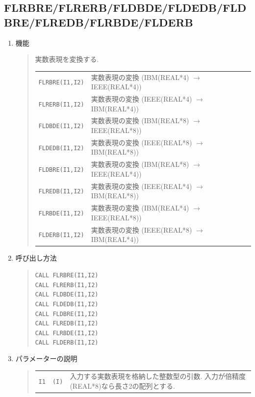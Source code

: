 \subsection{FLRBRE/FLRERB/FLDBDE/FLDEDB/FLDBRE/FLREDB/FLRBDE/FLDERB}
\begin{enumerate}
  \item 機能
  \begin{quote}
    実数表現を変換する.\\
    \begin{tabular}{lp{10cm}}
     {\tt FLRBRE(I1,I2)}  & 実数表現の変換 (IBM(REAL*4) $\to$ IEEE(REAL*4)) \\
     {\tt FLRERB(I1,I2)}  & 実数表現の変換 (IEEE(REAL*4) $\to$ IBM(REAL*4)) \\
     {\tt FLDBDE(I1,I2)}  & 実数表現の変換 (IBM(REAL*8) $\to$ IEEE(REAL*8)) \\
     {\tt FLDEDB(I1,I2)}  & 実数表現の変換 (IEEE(REAL*8) $\to$ IBM(REAL*8)) \\
     {\tt FLDBRE(I1,I2)}  & 実数表現の変換 (IBM(REAL*8) $\to$ IEEE(REAL*4)) \\
     {\tt FLREDB(I1,I2)}  & 実数表現の変換 (IEEE(REAL*4) $\to$ IBM(REAL*8)) \\
     {\tt FLRBDE(I1,I2)}  & 実数表現の変換 (IBM(REAL*4) $\to$ IEEE(REAL*8)) \\
     {\tt FLDERB(I1,I2)}  & 実数表現の変換 (IEEE(REAL*8) $\to$ IBM(REAL*4))
    \end{tabular}
  \end{quote}
  \item 呼び出し方法
  \begin{quote}
     {\tt CALL FLRBRE(I1,I2)} \\
     {\tt CALL FLRERB(I1,I2)} \\
     {\tt CALL FLDBDE(I1,I2)} \\
     {\tt CALL FLDEDB(I1,I2)} \\
     {\tt CALL FLDBRE(I1,I2)} \\
     {\tt CALL FLREDB(I1,I2)} \\
     {\tt CALL FLRBDE(I1,I2)} \\
     {\tt CALL FLDERB(I1,I2)}
  \end{quote}
  \item パラメーターの説明
  \begin{quote}
    \begin{tabular}{llp{10cm}}
      {\tt I1} & {\tt (I)} & 入力する実数表現を格納した整数型の引数. 
                             入力が倍精度(REAL*8)なら長さ2の配列とする.\\

\end{tabular}
\end{quote}
\end{enumerate}
